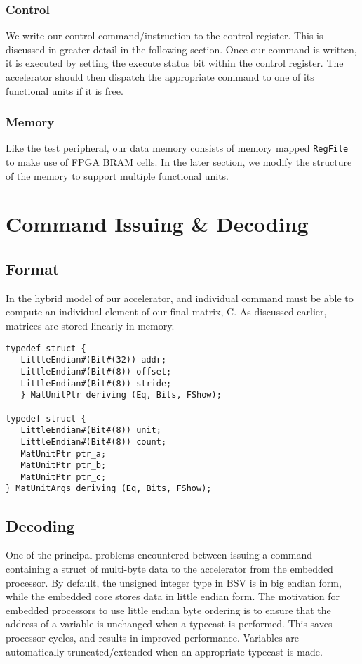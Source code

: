 \documentclass[a4paper,8pt]{report}
\begin{document}
\subsubsection{Control}
We write our control command/instruction to the control register. This is
discussed in greater detail in the following section. Once our command is
written, it is executed by setting the execute status bit within the control
register. The accelerator should then dispatch the appropriate command to one of
its functional units if it is free.

\subsubsection{Memory}
Like the test peripheral, our data memory consists of memory mapped
\texttt{RegFile} to make use of FPGA BRAM cells. In the later section, we modify
the structure of the memory to support multiple functional units.

\section{Command Issuing \& Decoding}
\subsection{Format}
In the hybrid model of our accelerator, and individual command must be able to
compute an individual element of our final matrix, C. As discussed earlier,
matrices are stored linearly in memory. 

\scriptsize
\begin{verbatim}
typedef struct {
   LittleEndian#(Bit#(32)) addr;
   LittleEndian#(Bit#(8)) offset;
   LittleEndian#(Bit#(8)) stride;
   } MatUnitPtr deriving (Eq, Bits, FShow);

typedef struct {
   LittleEndian#(Bit#(8)) unit;
   LittleEndian#(Bit#(8)) count;
   MatUnitPtr ptr_a;
   MatUnitPtr ptr_b;
   MatUnitPtr ptr_c;
} MatUnitArgs deriving (Eq, Bits, FShow);

\end{verbatim}
\normalsize

\subsection{Decoding}
One of the principal problems encountered between issuing a command containing
a struct of multi-byte data to the accelerator from the embedded processor. By
default, the unsigned integer type in BSV is in big endian form, while the
embedded core stores data in little endian form. The motivation for embedded
processors to use little endian byte ordering is to ensure that the address of a
variable is unchanged when a typecast is performed. This saves processor cycles,
and results in improved performance. Variables are automatically
truncated/extended when an appropriate typecast is made. \\
\end{document}
